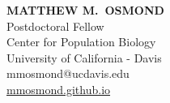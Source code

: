 \documentclass[12pt]{article}
\begin{document}
\thispagestyle{empty} 
\pagestyle{fancy}

{\raggedleft
\noindent\Large{\textbf{MATTHEW M.\ OSMOND}}\\
\large Postdoctoral Fellow\\
\large Center for Population Biology\\
\large University of California - Davis \\
\large mmosmond@ucdavis.edu\\
\href{https://mmosmond.github.io}{mmosmond.github.io}\\
}



%
\end{document}
